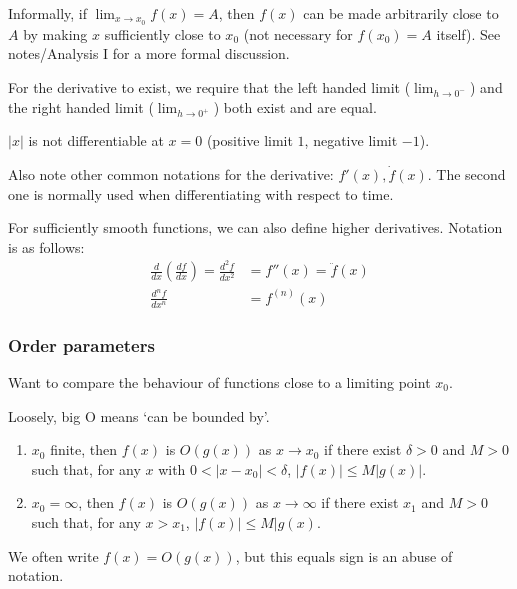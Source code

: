 \documentclass{../../template/note}
\begin{document}
    \begin{remark*}[Limits]
        Informally, if \(\lim_{x\to x_0}f(x) = A\), then \(f(x)\) can be made arbitrarily close to \(A\) by making \(x\) sufficiently close to \(x_0\) (not necessary for \(f(x_0) = A\) itself). See notes/Analysis I for a more formal discussion.
    \end{remark*}
    
    
    For the derivative to exist, we require that the left handed limit (\(\lim_{h\to 0^-}\)) and the right handed limit (\(\lim_{h\to 0^+}\)) both exist and are equal.

    \begin{example}
        \(|x|\) is not differentiable at \(x=0\) (positive limit \(1\), negative limit \(-1\)).
    \end{example}

    Also note other common notations for the derivative: \(f'(x), \dot f(x)\). The second one is normally used when differentiating with respect to time.

    For sufficiently smooth functions, we can also define higher derivatives. Notation is as follows:
    \begin{align*}
        \frac{d}{dx} \left(\frac{df}{dx}\right) = \frac{d^2f}{dx^2} &= f''(x) = \ddot f(x) \\
        \frac{d^nf}{dx^n} &= f^{(n)}(x)
    \end{align*}

    \subsubsection{Order parameters}

    Want to compare the behaviour of functions close to a limiting point \(x_0\).

    \begin{definition}
        Loosely, big O means `can be bounded by'.
        \begin{enumerate}[label=Case \arabic*.,leftmargin=55px]
            \item \(x_0\) finite, then \(f(x)\) is \(O(g(x))\) as \(x \to x_0\) if there exist \(\delta > 0\) and \(M > 0\) such that, for any \(x\) with \(0 < |x-x_0| < \delta\), \(|f(x)| \leq M|g(x)|\).
            \item \(x_0 = \infty\), then \(f(x)\) is \(O(g(x))\) as \(x \to \infty\) if there exist \(x_1\) and \(M > 0\) such that, for any \(x > x_1\), \(|f(x)| \leq M|g(x)\).
        \end{enumerate}
        We often write \(f(x) = O(g(x))\), but this equals sign is an abuse of notation.
    \end{definition}
\end{document}
